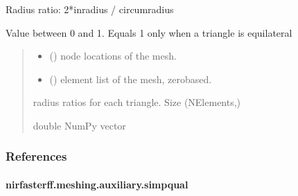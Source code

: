 \documentclass[letterpaper,10pt,english]{sphinxmanual}
\begin{document}
\begin{fulllineitems}
\label{\detokenize{_autosummary/nirfasterff.meshing.auxiliary.quality_triangle_radius:nirfasterff.meshing.auxiliary.quality_triangle_radius}}
\pysigstartsignatures
{}
\pysigstopsignatures
\sphinxAtStartPar
Radius ratio: 2*inradius / circumradius

\sphinxAtStartPar
Value between 0 and 1. Equals 1 only when a triangle is equilateral
\begin{quote}\begin{description}
\begin{itemize}
\item {} 
\sphinxAtStartPar
{} () \textendash{} node locations of the mesh.

\item {} 
\sphinxAtStartPar
{} () \textendash{} element list of the mesh, zero\sphinxhyphen{}based.

\end{itemize}

\sphinxAtStartPar
radius ratios for each triangle. Size (NElements,)

\sphinxAtStartPar
double NumPy vector

\end{description}\end{quote}
\subsubsection*{References}

\sphinxAtStartPar
{}

\end{fulllineitems}


\sphinxstepscope


\paragraph{nirfasterff.meshing.auxiliary.simpqual}
\label{\detokenize{_autosummary/nirfasterff.meshing.auxiliary.simpqual:nirfasterff-meshing-auxiliary-simpqual}}\label{\detokenize{_autosummary/nirfasterff.meshing.auxiliary.simpqual::doc}}
\end{document}
